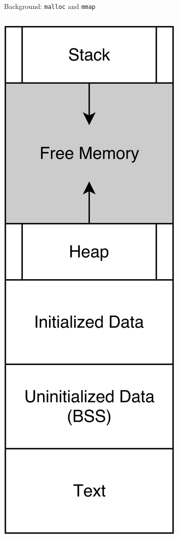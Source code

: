 \documentclass[aspectratio=169]{beamer}
\begin{document}
\begin{frame}{Background: \texttt{malloc} and \texttt{mmap}}
  \begin{columns}[T]
    \begin{column}{0.2\textwidth}
      \includegraphics[scale=0.05]{./figures/Address_space.png}

\end{column}
\end{columns}
\end{frame}
\end{document}
